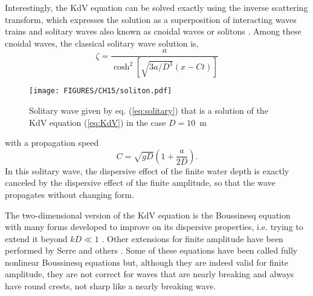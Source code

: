 Interestingly, the KdV equation can be solved exactly using the inverse scattering transform, which expresses the solution 
as a superposition of interacting waves trains and solitary waves also known as cnoidal waves or solitons \citep{Osborne&al.1996}. 
Among these cnoidal waves, the classical solitary wave solution is, 
\begin{equation}
    \zeta=\frac{a}{ \cosh^2\left[\sqrt{ 3a / D^3}\left(x-Ct\right)\right]} \label{eq:solitary}
\end{equation}
\begin{figure}
\centerline{\texttt{[image: FIGURES/CH15/soliton.pdf]}}
  \caption{Solitary wave given by eq. (\ref{eq:solitary}) that is a solution of the KdV equation (\ref{eq:KdV}) in the case  $D=10$~m}
\label{soliton}
\end{figure}
with a propagation speed 
\begin{equation}
C=\sqrt{gD} \left(1+\frac{a}{2D}\right). \label{eq:solitary_speed}
\end{equation}
In this solitary wave, the dispersive effect of the finite water depth is exactly 
canceled by the dispersive effect of the finite amplitude, so that the wave propagates without changing form. 

The two-dimensional version of the KdV equation is the Boussinesq equation with many forms developed to improve on its dispersive properties, i.e. 
trying to extend it beyond $kD \ll 1$ \citep{Nwogu1993,Nadaoka&al.1997}. Other extensions for finite amplitude have been performed by Serre and others
\citep{Lannes&Bonneton2009,Dias&Milewski2010}. Some of these equations have been called fully nonlinear Boussinesq equations but, although they 
are indeed valid for finite amplitude, they are not correct for waves that are nearly breaking and always have round crests, not sharp like a
nearly breaking wave. 

